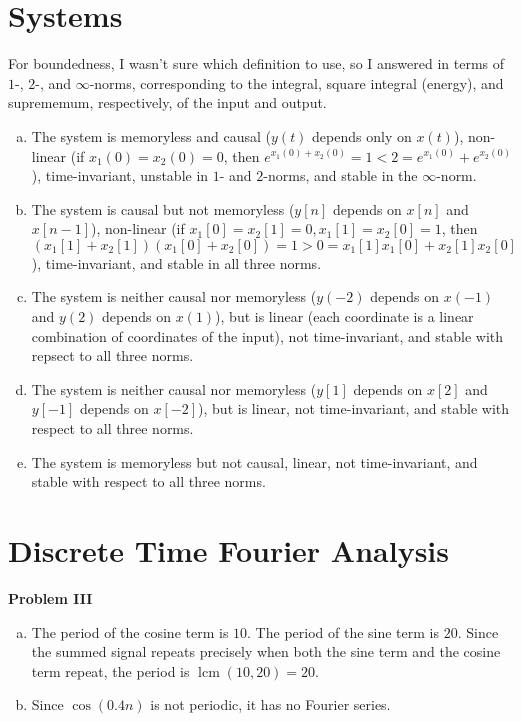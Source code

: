 \documentclass[11pt]{article}
\newcommand{\lcm}{\operatorname{lcm}} %
\begin{document}
\section{Systems}
For boundedness, I wasn't sure which definition to use, so I answered in terms
of $1$-, $2$-, and $\infty$-norms, corresponding to the integral, square
integral (energy), and suprememum, respectively, of the input and output.
\begin{enumerate}[a.]
\item The system is memoryless and causal ($y(t)$ depends only on $x(t)$),
non-linear (if $x_1(0) = x_2(0) = 0$, then
$e^{x_1(0) + x_2(0)} = 1 < 2 = e^{x_1(0)} + e^{x_2(0)}$), time-invariant,
unstable in $1$- and $2$-norms, and stable in the $\infty$-norm.

\item The system is causal but not memoryless ($y[n]$ depends on $x[n]$ and
$x[n - 1]$), non-linear (if $x_1[0] = x_2[1] = 0, x_1[1] = x_2[0] = 1$, then
$(x_1[1] + x_2[1])(x_1[0] + x_2[0]) = 1 > 0 = x_1[1]x_1[0] + x_2[1]x_2[0]$),
time-invariant, and stable in all three norms.

\item The system is neither causal nor memoryless ($y(-2)$ depends on $x(-1)$
and $y(2)$ depends on $x(1)$), but is linear (each coordinate is a linear
combination of coordinates of the input), not time-invariant, and stable with
repsect to all three norms.

\item The system is neither causal nor memoryless ($y[1]$ depends on $x[2]$ and
$y[-1]$ depends on $x[-2]$), but is linear, not time-invariant, and stable with
respect to all three norms.

\item The system is memoryless but not causal, linear, not time-invariant, and
stable with respect to all three norms.
\end{enumerate}

\newpage
\section{Discrete Time Fourier Analysis}

{\bf Problem III}
\begin{enumerate}[a.]
\item The period of the cosine term is $10$. The period of the sine term is
$20$. Since the summed signal repeats precisely when both
the sine term and the cosine term repeat, the period is $\lcm(10,20) = 20$.

\item Since $\cos(0.4 n)$ is not periodic, it has no Fourier series.
\end{enumerate}
\end{document}
